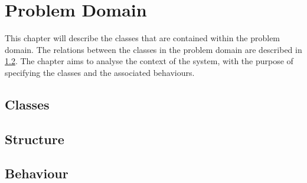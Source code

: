 \chapter{Problem Domain}

This chapter will describe the classes that are contained within the problem domain. The relations between the classes in the problem domain are described in \cref{sub:Structure}. The chapter aims to analyse the context of the system, with the purpose of specifying the classes and the associated behaviours.

\section{Classes}
\label{sub:pd_classes}


\section{Structure}
\label{sub:Structure}


\section{Behaviour}

